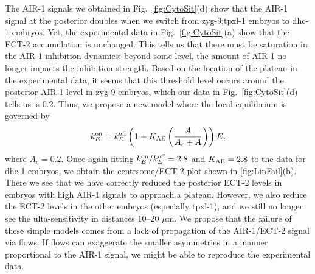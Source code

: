 \documentclass[11pt]{article}
\begin{document}
The AIR-1 signals we obtained in Fig.\ \ref{fig:CytoSit}(d) show that the AIR-1 signal at the posterior doubles when we switch from zyg-9;tpxl-1 embryos to dhc-1 embryos. Yet, the experimental data in Fig.\ \ref{fig:CytoSit}(a) show that the ECT-2 accumulation is unchanged. This tells us that there must be saturation in the AIR-1 inhibition dynamics; beyond some level, the amount of AIR-1 no longer impacts the inhibition strength. Based on the location of the plateau in the experimental data, it seems that this threshold level occurs around the posterior AIR-1 level in zyg-9 embryos, which our data in Fig.\ \ref{fig:CytoSit}(d) tells us is 0.2. Thus, we propose a new model where the local equilibrium is governed by 
\begin{equation}
\label{eq:EctASat}
 k^\text{on}_E = k^\text{off}_E \left(1+K_\text{AE} \left(\frac{A}{A_c+A}\right) \right)E,
\end{equation}
where $A_c=0.2$. Once again fitting $k^\text{on}_E/k^\text{off}_E=2.8$ and $K_\text{AE}=2.8$ to the data for dhc-1 embryos, we obtain the centrsome/ECT-2 plot shown in \ref{fig:LinFail}(b). There we see that we have correctly reduced the posterior ECT-2 levels in embryos with high AIR-1 signals to approach a plateau. However, we also reduce the ECT-2 levels in the other embryos (especially tpxl-1), and we still no longer see the ulta-sensitivity in distances 10--20 $\mu$m. We propose that the failure of these simple models comes from a lack of propagation of the AIR-1/ECT-2 signal via flows. If flows can exaggerate the smaller  asymmetries in a manner proportional to the AIR-1 signal, we might be able to reproduce the experimental data.
\end{document}

